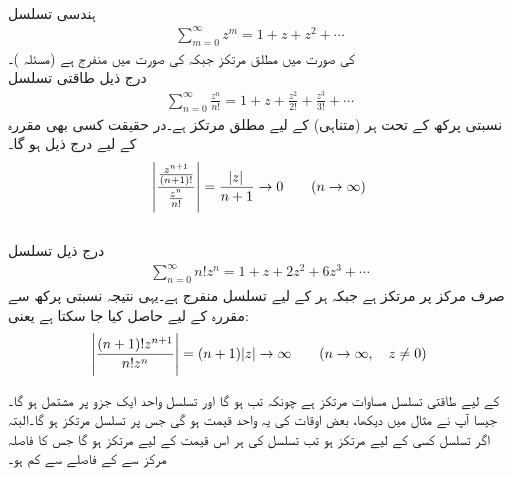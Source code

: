 \quad {}\\
ہندسی تسلسل
\begin{align*}
\sum\limits_{m=0}^{\infty} z^m=1+z+z^2+\cdots
\end{align*}
 کی صورت میں مطلق مرتکز جبکہ  کی صورت میں منفرج  ہے (مسئلہ )۔
\quad {}\\
درج ذیل طاقتی تسلسل
\begin{align*}
\sum\limits_{n=0}^{\infty} \frac{z^n}{n!}=1+z+\frac{z^2}{2!}+\frac{z^3}{3!}+\cdots
\end{align*}
نسبتی پرکھ کے تحت ہر (متناہی)  کے لیے مطلق مرتکز ہے۔در حقیقت کسی بھی مقررہ  کے لیے درج ذیل ہو گا۔
\begin{align*}
\abs{\frac{\tfrac{z^{n+1}}{(n+1)!}}{\tfrac{z^n}{n!}}}=\frac{\abs{z}}{n+1}\to 0 \quad \quad (n\to \infty)
\end{align*}
\quad {}\\
درج ذیل تسلسل
\begin{align*}
\sum\limits_{n=0}^{\infty} n! z^n=1+z+2z^2+6z^3+\cdots
\end{align*}
صرف مرکز  پر مرتکز ہے جبکہ ہر  کے لیے  تسلسل منفرج ہے۔یہی نتیجہ نسبتی پرکھ سے مقررہ  کے لیے حاصل کیا جا سکتا ہے یعنی:
\begin{align*}
\abs{\frac{(n+1)!z^{n+1}}{n!z^n}}=(n+1)\abs{z}\to \infty \quad \quad (n\to \infty,\quad z\ne 0)
\end{align*}

 کے لیے طاقتی تسلسل مساوات   مرتکز ہے چونکہ تب  ہو گا اور تسلسل واحد ایک جزو  پر مشتمل ہو گا۔ جیسا آپ نے مثال  میں دیکھا، بعض اوقات  کی یہ واحد قیمت ہو گی جس پر تسلسل مرتکز ہو گا۔البتہ اگر تسلسل  کسی  کے لیے مرتکز ہو تب تسلسل  کی ہر اس قیمت کے لیے مرتکز ہو گا  جس کا فاصلہ مرکز سے   کے فاصلے سے کم ہو۔

